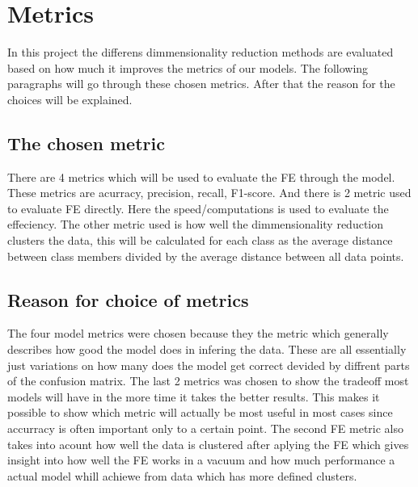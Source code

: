 \section{Metrics}
In this project the differens dimmensionality reduction methods are evaluated based on how much it improves the metrics of our models.
The following paragraphs will go through these chosen metrics. After that the reason for the choices will be explained.

\subsection{The chosen metric}
There are 4 metrics which will be used to evaluate the FE through the model. These metrics are acurracy, precision, recall, F1-score. And there is 2 metric used to evaluate FE directly. Here the speed/computations is used to evaluate the effeciency. The other metric used is how well the dimmensionality reduction clusters the data, this will be calculated for each class as the average distance between class members divided by the average distance between all data points.

\subsection{Reason for choice of metrics}
The four model metrics were chosen because they the metric which generally describes how good the model does in infering the data. These are all essentially just variations on 
how many does the model get correct devided by diffrent parts of the confusion matrix. The last 2 metrics was chosen to show the tradeoff most models will have in the more time it takes the better results. This makes it possible to show which metric will actually be most useful in most cases since accurracy is often important only to a certain point. The second FE metric also takes into acount how well the data is clustered after aplying the FE which gives insight into how well the FE works in a vacuum and how much performance a actual model whill achiewe from data which has more defined clusters.